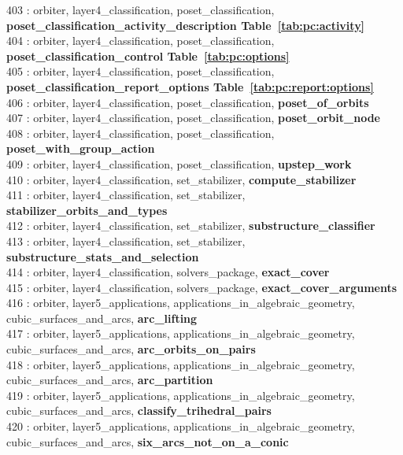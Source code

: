 403 : orbiter, layer4\_classification, poset\_classification, {\bf poset\_classification\_activity\_description Table~\ref{tab:pc:activity}}\\
404 : orbiter, layer4\_classification, poset\_classification, {\bf poset\_classification\_control Table~\ref{tab:pc:options}}\\
405 : orbiter, layer4\_classification, poset\_classification, {\bf poset\_classification\_report\_options Table~\ref{tab:pc:report:options}}\\
406 : orbiter, layer4\_classification, poset\_classification, {\bf poset\_of\_orbits}\\
407 : orbiter, layer4\_classification, poset\_classification, {\bf poset\_orbit\_node}\\
408 : orbiter, layer4\_classification, poset\_classification, {\bf poset\_with\_group\_action}\\
409 : orbiter, layer4\_classification, poset\_classification, {\bf upstep\_work}\\
410 : orbiter, layer4\_classification, set\_stabilizer, {\bf compute\_stabilizer}\\
411 : orbiter, layer4\_classification, set\_stabilizer, {\bf stabilizer\_orbits\_and\_types}\\
412 : orbiter, layer4\_classification, set\_stabilizer, {\bf substructure\_classifier}\\
413 : orbiter, layer4\_classification, set\_stabilizer, {\bf substructure\_stats\_and\_selection}\\
414 : orbiter, layer4\_classification, solvers\_package, {\bf exact\_cover}\\
415 : orbiter, layer4\_classification, solvers\_package, {\bf exact\_cover\_arguments}\\
416 : orbiter, layer5\_applications, applications\_in\_algebraic\_geometry, cubic\_surfaces\_and\_arcs, {\bf arc\_lifting}\\
417 : orbiter, layer5\_applications, applications\_in\_algebraic\_geometry, cubic\_surfaces\_and\_arcs, {\bf arc\_orbits\_on\_pairs}\\
418 : orbiter, layer5\_applications, applications\_in\_algebraic\_geometry, cubic\_surfaces\_and\_arcs, {\bf arc\_partition}\\
419 : orbiter, layer5\_applications, applications\_in\_algebraic\_geometry, cubic\_surfaces\_and\_arcs, {\bf classify\_trihedral\_pairs}\\
420 : orbiter, layer5\_applications, applications\_in\_algebraic\_geometry, cubic\_surfaces\_and\_arcs, {\bf six\_arcs\_not\_on\_a\_conic}\\
